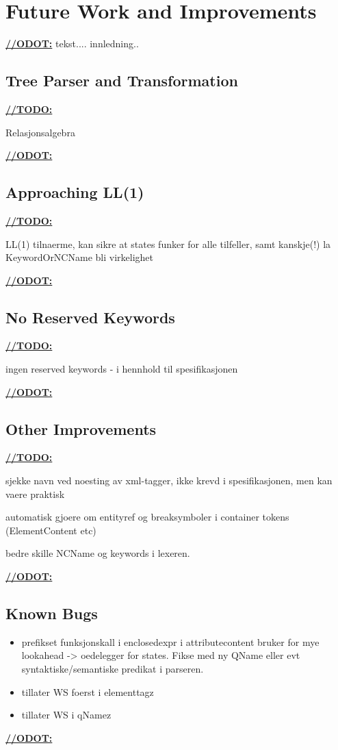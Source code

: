 \chapter{Future Work and Improvements}
\label{sect:summary:future_work}
\underline{\textbf{\LARGE //ODOT:}} tekst.... innledning..




\section{Tree Parser and Transformation}
\underline{\textbf{\LARGE //TODO:}}

Relasjonsalgebra

\underline{\textbf{\LARGE //ODOT:}}

\section{Approaching LL(1)}

\underline{\textbf{\LARGE //TODO:}}

LL(1) tilnaerme, kan sikre at states funker for alle tilfeller, samt kanskje(!) la KeywordOrNCName bli virkelighet

\underline{\textbf{\LARGE //ODOT:}}

\section{No Reserved Keywords}

\underline{\textbf{\LARGE //TODO:}}

ingen reserved keywords - i hennhold til spesifikasjonen

\underline{\textbf{\LARGE //ODOT:}}

\section{Other Improvements}

\underline{\textbf{\LARGE //TODO:}}

sjekke navn ved noesting av xml-tagger, ikke krevd i spesifikasjonen, men kan vaere praktisk

automatisk gjoere om entityref og breaksymboler i container tokens (ElementContent etc)

bedre skille NCName og keywords i lexeren.

\underline{\textbf{\LARGE //ODOT:}}

\section{Known Bugs}
\label{sect:future:knownBugs}
\begin{itemize}
		\item prefikset funksjonskall i enclosedexpr i attributecontent bruker for mye lookahead -> oedelegger for states. Fikse med ny QName eller evt syntaktiske/semantiske predikat i parseren.
		\item tillater WS foerst i elementtagz
		\item tillater WS i qNamez
	\end{itemize}

\underline{\textbf{\LARGE //ODOT:}}
